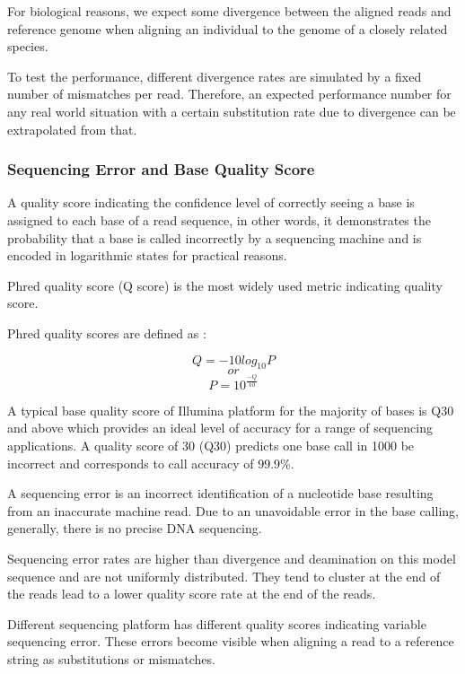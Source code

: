\documentclass[11pt,a4paper]{report}
\begin{document}
For biological reasons, we expect some divergence between
the aligned reads and reference genome when aligning an individual 
to the genome of a closely related species.

To test the performance, different divergence rates are simulated by 
a fixed number of mismatches per read. Therefore, an expected performance 
number for any real world situation with a certain substitution rate due to 
divergence can be extrapolated from that.
 
 

\subsubsection{Sequencing Error and Base Quality Score} 
\label{Sequencing Error and Base Quality Score}
 

A quality score indicating the confidence level of correctly seeing a 
base is assigned to each base of a read sequence, in other words, it 
demonstrates the probability that a base is called incorrectly by a 
sequencing machine and is encoded in logarithmic states for practical 
reasons.

Phred quality score (Q score) is the most widely used metric
indicating quality score.


Phred quality scores are defined as \cite{phred2}:

$$ Q = -10  log_{10}P   $$
$$  or $$
$$ P = 10 ^ { \frac{-Q}{ 10 } } $$


A typical base quality score of Illumina platform for the majority of 
bases is Q30 and above which provides an ideal level of accuracy for a 
range of sequencing applications. 
A quality score of 30 (Q30) predicts one base call in 1000 be incorrect
and corresponds to call accuracy of 99.9\%.

A sequencing error is an incorrect identification of a nucleotide base 
resulting from an inaccurate machine read. Due to an unavoidable error 
in the base calling, generally, there is no precise DNA sequencing. 

Sequencing error rates are higher than divergence and deamination
on this model sequence and are not uniformly distributed. They tend to 
cluster at the end of the reads lead to a lower quality score rate at 
the end of the reads.

Different sequencing platform has different quality scores indicating 
variable sequencing error. These errors become visible when aligning a 
read to a reference string as substitutions or mismatches.
\end{document}
